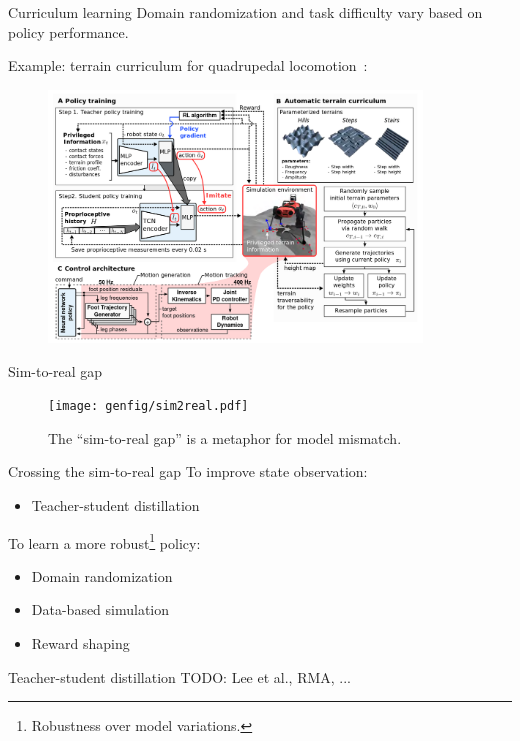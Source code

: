 \documentclass[10pt, aspectratio=1610]{beamer}
\begin{document}
\begin{frame}{Curriculum learning}
    Domain randomization and task difficulty vary based on policy performance.

    Example: terrain curriculum for quadrupedal locomotion~\cite{lee2020}:
    \begin{figure}
        \includegraphics[height=6.7cm]{figures/quadruped-curriculum.png}
    \end{figure}
\end{frame}

\begin{frame}{Sim-to-real gap}
    \begin{figure}
        \texttt{[image: genfig/sim2real.pdf]}
        \caption{The ``sim-to-real gap'' is a metaphor for model mismatch.}
    \end{figure}
\end{frame}

\begin{frame}{Crossing the sim-to-real gap}
    To improve state observation:
    \begin{itemize}
        \item Teacher-student distillation
    \end{itemize}
    To learn a more robust\footnote{Robustness over model variations.} policy:
    \begin{itemize}
        \item Domain randomization
        \item Data-based simulation
        \item Reward shaping
    \end{itemize}
\end{frame}

\begin{frame}{Teacher-student distillation}
    TODO: Lee et al., RMA, ...
\end{frame}
\end{document}
